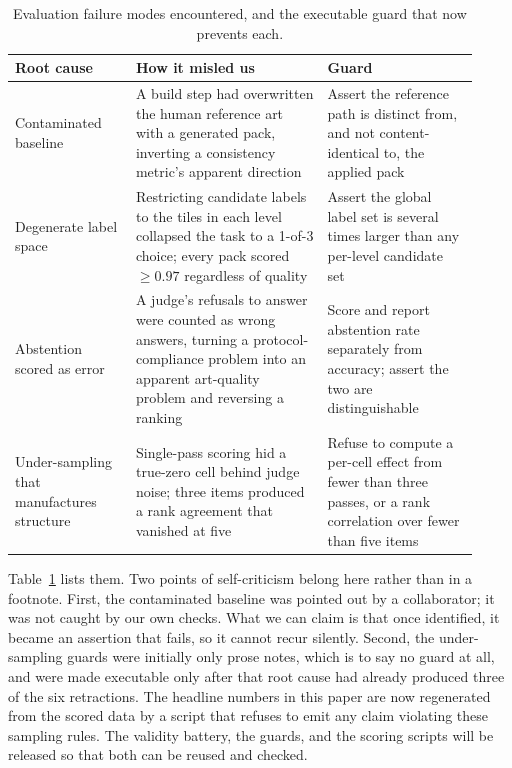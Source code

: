\documentclass{article}
\begin{document}
\begin{table}[t]
  \centering
  \caption{Evaluation failure modes encountered, and the executable guard that now prevents each.}
  \label{tab:failures}
  \small
  \begin{tabular}{@{}p{0.24\linewidth}p{0.38\linewidth}p{0.30\linewidth}@{}}
    \toprule
    Root cause & How it misled us & Guard \\
    \midrule
    Contaminated baseline &
    A build step had overwritten the human reference art with a generated pack, inverting a
    consistency metric's apparent direction &
    Assert the reference path is distinct from, and not content-identical to, the applied pack \\
    \addlinespace
    Degenerate label space &
    Restricting candidate labels to the tiles in each level collapsed the task to a 1-of-3 choice;
    every pack scored $\geq 0.97$ regardless of quality &
    Assert the global label set is several times larger than any per-level candidate set \\
    \addlinespace
    Abstention scored as error &
    A judge's refusals to answer were counted as wrong answers, turning a protocol-compliance
    problem into an apparent art-quality problem and reversing a ranking &
    Score and report abstention rate separately from accuracy; assert the two are distinguishable \\
    \addlinespace
    Under-sampling that manufactures structure &
    Single-pass scoring hid a true-zero cell behind judge noise; three items produced a rank
    agreement that vanished at five &
    Refuse to compute a per-cell effect from fewer than three passes, or a rank correlation over
    fewer than five items \\
    \bottomrule
  \end{tabular}
\end{table}

Table~\ref{tab:failures} lists them. Two points of self-criticism belong here rather than in a
footnote. First, the contaminated baseline was pointed out by a collaborator; it was not caught by
our own checks. What we can claim is that once identified, it became an assertion that fails, so it
cannot recur silently. Second, the under-sampling guards were initially only prose notes, which is
to say no guard at all, and were made executable only after that root cause had already produced
three of the six retractions. The
headline numbers in this paper are now regenerated from the scored data by a script that refuses to
emit any claim violating these sampling rules. The validity battery, the guards, and the scoring
scripts will be released so that both can be reused and checked.
\end{document}
